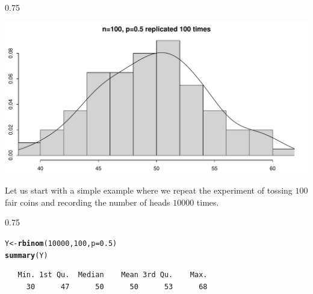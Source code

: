 \documentclass{beamer}\usepackage[]{graphicx}\usepackage[]{color}
\makeatletter
\newcommand{\hlnum}[1]{\textcolor[rgb]{0.2,0.2,0.2}{#1}}%
\newcommand{\hlstd}[1]{\textcolor[rgb]{0.102,0.102,0.102}{#1}}%
\newcommand{\hlkwb}[1]{\textcolor[rgb]{0.102,0.102,0.102}{#1}}%
\newcommand{\hlkwc}[1]{\textcolor[rgb]{0.2,0.2,0.2}{#1}}%
\newcommand{\hlkwd}[1]{\textcolor[rgb]{0.102,0.102,0.102}{\textbf{#1}}}%
\newenvironment{kframe}{%
 \def\at@end@of@kframe{}%
 \ifinner\ifhmode%
  \def\at@end@of@kframe{\end{minipage}}%
  \begin{minipage}{\columnwidth}%
 \fi\fi%
 \def\FrameCommand##1{\hskip\@totalleftmargin \hskip-\fboxsep
 \colorbox{shadecolor}{##1}\hskip-\fboxsep
     \hskip-\linewidth \hskip-\@totalleftmargin \hskip\columnwidth}%
 \MakeFramed {\advance\hsize-\width
   \@totalleftmargin\z@ \linewidth\hsize
   \@setminipage}}%
 {\par\unskip\endMakeFramed%
 \at@end@of@kframe}
\newenvironment{knitrout}{}{} %
\renewenvironment{knitrout}{\begin{spacing}{0.75}\begin{tiny}}{\end{tiny}\end{spacing}}
\makeatother
\begin{document}
\begin{frame}[fragile]

\begin{knitrout}\small
{}\color{fgcolor}

{\centering \includegraphics[width=0.89\linewidth]{figure/graphics-unnamed-chunk-5-1} 

}



\end{knitrout}

\end{frame}

\begin{frame}[fragile]

Let us start with a simple example where we repeat the experiment of tossing
$100$ fair coins and recording the number of heads $10000$ times.

\begin{knitrout}\small
{}\color{fgcolor}\begin{kframe}
\begin{alltt}
\hlstd{Y} \hlkwb{<-} \hlkwd{rbinom}\hlstd{(}\hlnum{10000}\hlstd{,} \hlnum{100}\hlstd{,} \hlkwc{p}\hlstd{=}\hlnum{0.5}\hlstd{)}
\hlkwd{summary}\hlstd{(Y)}
\end{alltt}
\begin{verbatim}
   Min. 1st Qu.  Median    Mean 3rd Qu.    Max. 
     30      47      50      50      53      68 
\end{verbatim}
\end{kframe}
\end{knitrout}

\end{frame}
\end{document}
